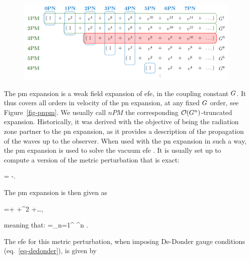 \documentclass[
  11pt,
  a4paper,
  DIV=11,
  numbers=noendperiod,
  oneside]{scrreprt}
\let\[\relax \let\]\relax %
\DeclareRobustCommand{\[}{\begin{equation}}
\DeclareRobustCommand{\]}{\end{equation}}
\begin{document}
\begin{figure}


{\centering \includegraphics{./PMPNtrans.png}

}

\end{figure}

The \acrfull{pm} expansion is a weak field expansion of \gls{efe}, in
the coupling constant \(\grav\). It thus covers all orders in velocity
of the \gls{pn} expansion, at any fixed \(\grav\) order, see
Figure~\ref{fig-pnpm}. We usually call \(nPM\) the corresponding
\(\order[n]{\grav}\)-truncated expansion. Historically, it was derived
with the objective of being the radiation zone partner to the \gls{pn}
expansion, as it provides a description of the propagation of the waves
up to the observer. When used with the \gls{pn} expansion in such a way,
the \gls{pm} expansion is used to solve the vacuum \gls{efe} . It is
usually set up to compute a version of the metric perturbation that is
exact:

\[\pertmet=\sqrt{-\metricTensor} \invmet-\invmink.\]

The \gls{pm} expansion is then given as

\[
\sqrt{-\metricTensor} \invmet=\invmink+ \grav {}+\grav^2 +\ldots,
\]

meaning that: \[
\invpertmet=\sum\limits_{n=1}^{\infty} \grav^n  .
\]

The \gls{efe} for this metric perturbation, when imposing De-Donder
gauge conditions (eq.~\ref{eq-dedonder}), is given by
\end{document}
